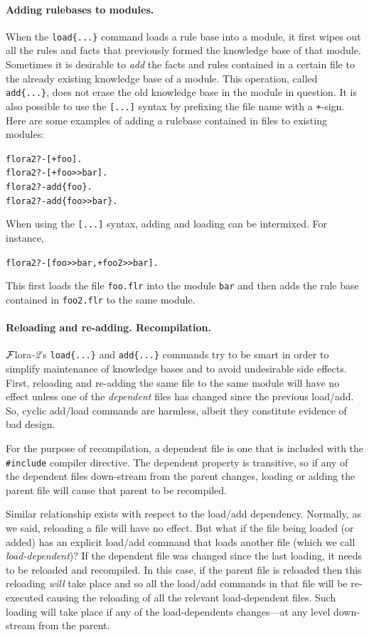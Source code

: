 \documentclass[11pt]{article}
\newcommand{\FLORA}{{\mbox{\sc ${\cal F}${lora}\rm\emph{-2}}}\xspace}
\newcommand{\FLSYSTEM}{\FLORA}
\newcommand{\prompt}{flora2 ?- }
\newcommand{\flrext}{flr\xspace}
\begin{document}
\paragraph{Adding rulebases to modules.}
When the {\tt load\{...\}} command loads a rule base into a module, it first wipes
out all the rules and facts that previously formed the knowledge base of
that module. Sometimes it is desirable to \emph{add} the facts and
rules contained in a certain file to the already existing knowledge base of
a module. This operation, called {\tt add\{...\}}, does not erase the old
knowledge base in the module in question.  It is also possible to use the
{\tt [...]} syntax by prefixing the file name with a {\tt +}-sign. Here are
some examples of adding a rulebase contained in files to existing
modules:
\index{\tt [file]}
\begin{alltt}
     \prompt [+foo].
     \prompt [+foo>{}>bar].
     \prompt add\{foo\}.
     \prompt add\{foo>{}>bar\}.
\end{alltt}
When using the {\tt [...]} syntax, adding and loading can be
intermixed. For instance, 
\begin{alltt}
      \prompt [foo>{}>bar, +foo2>{}>bar].
\end{alltt}
This first loads the file {\tt foo.\flrext} into the module {\tt bar} and then
adds the rule base contained in {\tt foo2.\flrext} to the same module.

\paragraph{Reloading and re-adding. Recompilation.}
\FLSYSTEM's \texttt{load\{...\}}  and \texttt{add\{...\}} commands try to be smart in
order to simplify maintenance of knowledge bases and to avoid undesirable
side effects. First, reloading and re-adding the same file to the same
module will have no effect unless one of the \emph{dependent} files has
changed since the previous load/add. So, cyclic add/load commands
are harmless, albeit they constitute evidence of bad design.

For the purpose of recompilation, a dependent file is
one that is included with the \texttt{\#include} compiler directive.
The dependent property is
transitive, so if any of the dependent files down-stream from the parent changes, loading
or adding  the parent file will cause that parent to be recompiled.

Similar relationship exists with respect to the load/add dependency.
Normally, as we said, reloading a file will have no effect. But what if the
file being loaded (or added) has an explicit load/add command that loads
another file (which we call \emph{load-dependent})? If the dependent file
was changed since the last loading, it needs to be reloaded and recompiled. In this case, if the parent file is
reloaded then this reloading \emph{will} take place and so all the
load/add commands in that file will be re-executed causing the reloading
of all the relevant 
load-dependent files. Such loading will
take place if any of the load-dependents changes---at any level down-stream from the
parent.
\end{document}
